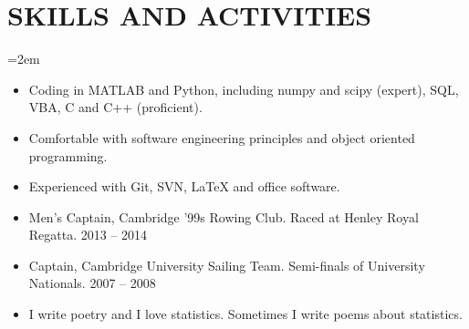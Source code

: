\documentclass[letterpaper,10pt]{article}
\newcommand{\NewPart}[1]{\vspace{-1em} \section*{\uppercase{#1}}}
\newcommand{\Details}[1]{\hangindent=2em\hangafter=0\small#1\normalsize\par}
\begin{document}
\NewPart{Skills and Activities}

\Details{
\begin{itemize}
 \item Coding in MATLAB and Python, including numpy and scipy (expert), SQL, VBA, C and C++ (proficient).
 \item Comfortable with software engineering principles and object oriented programming.
 \item Experienced with Git, SVN, LaTeX and office software.
 \item Men's Captain, Cambridge '99s Rowing Club. Raced at Henley Royal Regatta. 2013 -- 2014
 \item Captain, Cambridge University Sailing Team. Semi-finals of University Nationals. 2007 -- 2008
 \item I write poetry and I love statistics. Sometimes I write poems about statistics.
\end{itemize}
}
\end{document}
